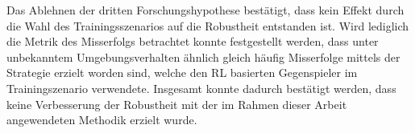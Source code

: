 Das Ablehnen der dritten Forschungshypothese bestätigt, dass kein Effekt durch die Wahl des Trainingsszenarios auf die Robustheit entstanden ist.
Wird lediglich die Metrik des Misserfolgs betrachtet konnte festgestellt werden, dass unter unbekanntem Umgebungsverhalten ähnlich gleich häufig Misserfolge mittels der Strategie erzielt worden sind, welche den RL basierten Gegenspieler im Trainingszenario verwendete.
Insgesamt konnte dadurch bestätigt werden, dass keine Verbesserung der Robustheit mit der im Rahmen dieser Arbeit angewendeten Methodik erzielt wurde.
